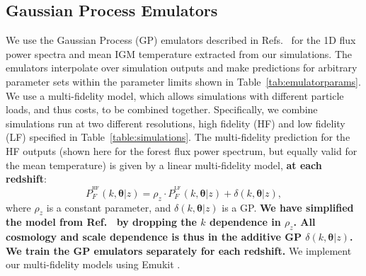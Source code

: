 
\subsection{Gaussian Process Emulators}\label{sec:gps}

We use the Gaussian Process (GP) emulators described in Refs.~\cite{2022MNRAS.517.3200F, 2023simsuite} for the 1D flux power spectra and mean IGM temperature extracted from our simulations.
The emulators interpolate over simulation outputs and make predictions for arbitrary parameter sets within the parameter limits shown in Table~\ref{tab:emulatorparams}.
We use a multi-fidelity model, which allows simulations with different particle loads, and thus costs, to be combined together.
Specifically, we combine simulations run at two different resolutions, high fidelity (HF) and low fidelity (LF) specified in Table~\ref{table:simulations}. 
The multi-fidelity prediction for the HF outputs (shown here for the \lya forest flux power spectrum, but equally valid for the mean temperature) is given by a linear multi-fidelity model, \textbf{at each redshift}:
\begin{equation}
    P_F^{^\mathrm{HF}}(k, \boldsymbol{\theta} | z) = \rho_z \cdot P_F^{^\mathrm{LF}}(k, \boldsymbol{\theta} | z) + \delta(k, \boldsymbol{\theta} | z),
    \label{eq:ko_model}
\end{equation}
where $\rho_z$ is a constant parameter, and $\delta(k, \boldsymbol{\theta} | z)$ is a GP. \textbf{We have simplified the model from Ref.~\cite{2022MNRAS.517.3200F} by dropping the $k$ dependence in $\rho_z$. All cosmology and scale dependence is thus in the additive GP $\delta(k, \boldsymbol{\theta} | z)$. We train the GP emulators separately for each redshift.} We implement our multi-fidelity models using Emukit \cite{2021arXiv211013293P}.

